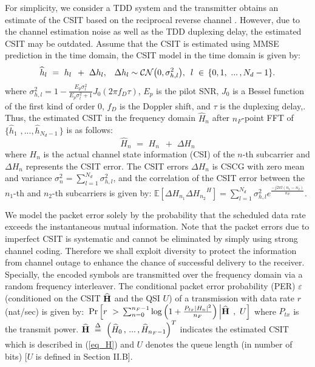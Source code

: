 \documentclass[11pt,journal, onecolumn]{./IEEEtran}
\newcommand{\blue}{\color{black}}
\newcommand{\black}{\color{black}}
\newcommand{\red}{\color{black}}
\begin{document}
For simplicity, we consider a TDD system and the transmitter obtains an estimate of the CSIT based on the reciprocal reverse channel \cite{marzetta_fast_2006}. However, due to the channel estimation noise as well as the TDD duplexing delay, the estimated CSIT may be outdated. Assume that the CSIT is estimated using MMSE prediction in the time domain, the CSIT model in the time domain is given by:
\[{\widehat h_l}\,\, = \,\,{h_l}\,\,\, + \,\,\Delta {h_l},\,\,\,\,\,{\red \Delta {h_l} \sim \mathcal{CN}\big(0,\sigma_{h,l}^2\big),\,\,\,l\,\, \in \,\{ 0,1,\,\,...\,,N_d - 1\}} .\]
{\red  where $\sigma_{h,l}^2=1-\frac{E_p\sigma_l^2}{E_p\sigma_l^2+1}J_0(2\pi f_D\tau)$, $E_p$ is the pilot SNR, $J_0$ is a Bessel function of the first kind of order 0, $f_D$ is the Doppler shift, and $\tau$ is the duplexing delay\cite{csi_error_it}},{\blue \cite{Ramyadelayfb2009}}. Thus, the estimated CSIT in the frequency domain $\widehat H_n$ after $n_F$-point FFT of $\{ {\widehat h_1}\,\,,...,{\widehat h_{N_d - 1}}\,\}$ is as follows:
\begin{equation}\label{eq_H}
{\widehat H_n}\,\, = \,\,{H_n}\,\,\, + \,\,\Delta {H_n}
\end{equation}
where $H_n$ is the actual channel state information (CSI) of the $n$-th subcarrier and $\Delta {H_n}$ represents the CSIT error. \red The CSIT errors $\Delta {H_n}$ is CSCG with zero mean and variance $\sigma_n^2=\sum\nolimits_{l=1}^{N_d}\sigma_{h,l}^2$, and the correlation of the CSIT error between the $n_1$-th and $n_2$-th subcarriers is given by:
$\mathbb{E}[\Delta {H_{{n_1}}}\Delta {H_{{n_2}}}^H] = \sum\nolimits_{l=1}^{N_d}\sigma_{h,l}^2e^{\frac{ - j2\pi l(n_1-n_2)}{n_F}}$.

\black
We model the packet error solely by the probability that the scheduled data rate exceeds the instantaneous mutual information. Note that the packet errors due to imperfect CSIT is systematic and cannot be eliminated by simply using strong channel coding. Therefore we shall exploit diversity to protect the information from channel outage to enhance the chance of successful delivery to the receiver. Specially, the encoded symbols are transmitted over the frequency domain via a random frequency interleaver. The conditional packet error probability (PER) $\varepsilon$ (conditioned on the CSIT ${\widehat{\bf{H}}}$ and the QSI $U$) of a transmission with data rate $r$ (nat/sec) is given by: $\,\Pr \left[ {r\,\, > \,\sum\nolimits_{n = 0}^{{n_F} - 1} {\log \left( {1 + \frac{{{P_{tx}}{{\left| {{H_n}} \right|}^2}}}{{{n_F}}}} \right)} \left| {\widehat{\bf{H}}} \right.\,,\,\,U} \right]$ where $P_{tx}$ is the transmit power. $\widehat{\bf{H}}\,\, \buildrel \Delta \over = \,\,{\left( {{{\widehat H}_0}\,,\,...\,,{{\widehat{H}}_{{n_F} - 1}}} \right)^T}$ indicates the estimated CSIT which is described in (\ref{eq_H}) and $U$ denotes the queue length (in number of bits) [$U$ is defined in Section II.B].
\end{document}
